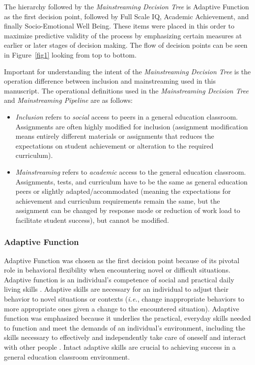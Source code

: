\documentclass[twoside]{article}
\begin{document}
The hierarchy followed by the \textit{Mainstreaming Decision Tree} is Adaptive Function as the first decision point, followed by Full Scale IQ, Academic Achievement, and finally Socio-Emotional Well Being. These items were placed in this order to maximize predictive validity of the process by emphasizing certain measures at earlier or later stages of decision making. The flow of decision points can be seen in Figure~\ref{fig1} looking from top to bottom.

Important for understanding the intent of the \textit{Mainstreaming Decision Tree} is the operation difference between inclusion and mainstreaming used in this manuscript. The operational definitions used in the \textit{Mainstreaming Decision Tree} and \textit{Mainstreaming Pipeline} are as follows: 
\begin{itemize}
	\item \textit{Inclusion} refers to \textit{social} access to peers in a general education classroom. Assignments are often highly modified for inclusion (assignment modification means entirely different materials or assignments that reduces the expectations on student achievement or alteration to the required curriculum). 
	
	\item \textit{Mainstreaming} refers to \textit{academic} access to the general education classroom. Assignments, tests, and curriculum have to be the same as general education peers or slightly adapted/accommodated (meaning the expectations for achievement and curriculum requirements remain the same, but the assignment can be changed by response mode or reduction of work load to facilitate student success), but cannot be modified. 
\end{itemize}

\subsubsection{Adaptive Function}
Adaptive Function was chosen as the first decision point because of its pivotal role in behavioral flexibility when encountering novel or difficult situations. Adaptive function is an individual's competence of social and practical daily living skills \parencite{de2005adaptive,ditterline2008adaptive,gresham1987relationship}. Adaptive skills are necessary for an individual to adjust their behavior to novel situations or contexts (\textit{i.e.}, change inappropriate behaviors to more appropriate ones given a change to the encountered situation). Adaptive function was emphasized because it underlies the practical, everyday skills needed to function and meet the demands of an individual's environment, including the skills necessary to effectively and independently take care of oneself and interact with other people \parencite{oakland2011adaptive}. Intact adaptive skills are crucial to achieving success in a general education classroom environment. 
\end{document}

